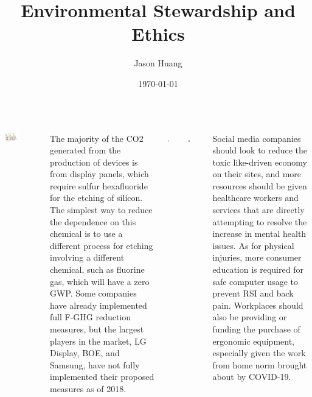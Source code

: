 \documentclass[a1paper, 25pt]{tikzposter}
\title{Environmental Stewardship and Ethics}
\author{Jason Huang}
\date{\today}
\institute{ICS4U0 @ John Fraser Secondary School}
\begin{document}
\maketitle

\begin{columns}
   {
    \begin{tikzfigure}
      \includegraphics[width=0.4\textwidth]{images/environment.png}
    \end{tikzfigure}
    The majority of the CO2 generated from the production of devices is from display panels, which require sulfur hexafluoride for the etching of silicon. The simplest way to reduce the dependence on this chemical is to use a different process for etching involving a different chemical, such as fluorine gas, which will have a zero GWP. Some companies have already implemented full F-GHG reduction measures, but the largest players in the market, LG Display, BOE, and Samsung, have not fully implemented their proposed measures as of 2018.
  }

   {
    \begin{columns}
      \begin{tikzfigure}
        \includegraphics[width=0.2\textwidth]{images/social-media.png}
      \end{tikzfigure}

      \begin{tikzfigure}
        \includegraphics[width=0.2\textwidth]{images/rsi.png}
      \end{tikzfigure}
    \end{columns}
    Social media companies should look to reduce the toxic like-driven economy on their sites, and more resources should be given healthcare workers and services that are directly attempting to resolve the increase in mental health issues. As for physical injuries, more consumer education is required for safe computer usage to prevent RSI and back pain. Workplaces should also be providing or funding the purchase of ergonomic equipment, especially given the work from home norm brought about by COVID-19.
  }
\end{columns}
\end{document}
